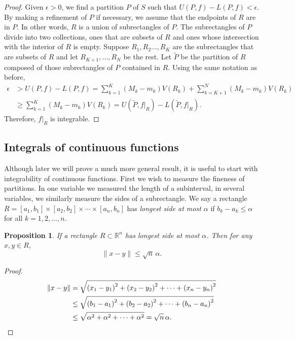\documentclass[12pt]{book}
\newcommand{\snorm}[1]{\lVert {#1} \rVert}
\newcommand{\R}{{\mathbb{R}}}
\theoremstyle{plain}
\newtheorem{prop}[thm]{Proposition}
\theoremstyle{remark}
\theoremstyle{definition}
\theoremstyle{exercise}
\theoremstyle{example}
\begin{document}
\begin{proof}
Given $\epsilon > 0$, we find a partition $P$ of $S$ such that
$U(P,f)-L(P,f) < \epsilon$.  By making a refinement of $P$
if necessary,
we assume that the endpoints of $R$ are in $P$.  In other words,
$R$ is a union of subrectangles of $P$.  The subrectangles of $P$
divide into two collections, ones that are subsets of $R$
and ones whose intersection with the interior of $R$ is empty.
Suppose $R_1,R_2\ldots,R_K$ are the subrectangles that
are subsets of $R$ and let $R_{K+1},\ldots, R_N$ be the rest.
Let $\widetilde{P}$ be the partition of $R$ composed of 
those subrectangles of $P$ contained in $R$.
Using the same notation as before,
\begin{equation*}
\begin{split}
\epsilon & > 
U(P,f)-L(P,f)
=
\sum_{k=1}^K (M_k-m_k) V(R_k)
+
\sum_{k=K+1}^N (M_k-m_k) V(R_k)
\\
&
\geq
\sum_{k=1}^K (M_k-m_k) V(R_k)
=
U(\widetilde{P},f|_R)-L(\widetilde{P},f|_R) .
\end{split}
\end{equation*}
Therefore, $f|_R$ is integrable.
\end{proof}

\subsection{Integrals of continuous functions}

Although later we will prove a much more general result, it is useful to start
with integrability of continuous functions.
First we wish to measure the fineness of partitions.  In one variable we
measured the length of a subinterval, in several variables, we similarly
measure the sides of a subrectangle.
We say a rectangle $R = [a_1,b_1] \times
[a_2,b_2] \times \cdots \times
[a_n,b_n]$ has \emph{longest side at most $\alpha$} if
$b_k-a_k \leq \alpha$ for all $k=1,2,\ldots,n$.

\begin{prop} \label{prop:diameterrectangle}
If a rectangle $R \subset \R^n$ has longest side at most $\alpha$.  Then
for any $x,y \in R$,
\begin{equation*}
\snorm{x-y} \leq \sqrt{n} \, \alpha .
\end{equation*}
\end{prop}

\begin{proof}
\begin{equation*}
\begin{split}
\snorm{x-y} 
& =
\sqrt{
{(x_1-y_1)}^2
+
{(x_2-y_2)}^2
+ \cdots +
{(x_n-y_n)}^2
}
\\
& \leq
\sqrt{
{(b_1-a_1)}^2
+
{(b_2-a_2)}^2
+ \cdots +
{(b_n-a_n)}^2
}
\\
& \leq
\sqrt{
{\alpha}^2
+
{\alpha}^2
+ \cdots +
{\alpha}^2
}
=
\sqrt{n} \, \alpha .  \qedhere
\end{split}
\end{equation*}
\end{proof}
\end{document}
